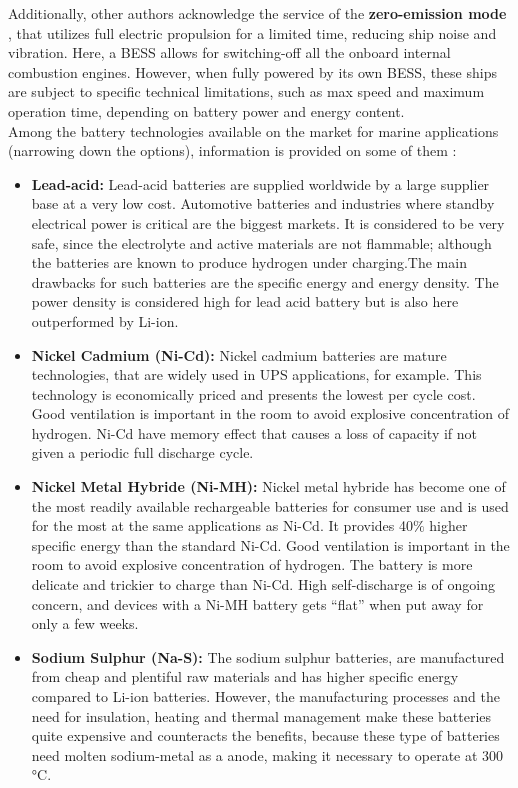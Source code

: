 Additionally, other authors acknowledge the service of the \textbf{zero-emission mode} \cite{Luca}, that utilizes full electric propulsion for a limited time, reducing ship noise and vibration. Here, a BESS allows for switching-off all the onboard internal combustion engines. However, when fully powered by its own BESS, these ships are subject to specific technical limitations, such as max speed and maximum operation time, depending on battery power and energy content.\\

Among the battery technologies available on the market for marine applications (narrowing down the options), information is provided on some of them \cite{EMSA}:

\begin{itemize}
	\item \textbf{Lead-acid:} Lead-acid batteries are supplied worldwide by a large supplier base at a very low cost. Automotive batteries and industries where standby electrical power is critical are the biggest markets. It is considered to be very safe, since the electrolyte and active materials are not flammable; although the batteries are known to produce hydrogen under charging.The main drawbacks for such batteries are the specific energy and energy density. The power density is considered high for lead acid battery but is also here outperformed by Li-ion.
	\item \textbf{Nickel Cadmium (Ni-Cd):} Nickel cadmium batteries are mature technologies, that are widely used in UPS applications, for example. This technology is economically priced and presents the lowest per cycle cost. Good ventilation is important in the room to avoid explosive concentration of hydrogen. Ni-Cd have memory effect that causes a loss of capacity if not given a periodic full discharge cycle.
	\item \textbf{Nickel Metal Hybride (Ni-MH):} Nickel metal hybride has become one of the most readily available rechargeable batteries for consumer use and is used for the most at the same applications as Ni-Cd. It provides 40$\%$ higher specific energy than the standard Ni-Cd. Good ventilation is important in the room to avoid explosive concentration of hydrogen. The battery is more delicate and trickier to charge than Ni-Cd. High self-discharge is of ongoing concern, and devices with a Ni-MH battery gets “flat” when put away for only a few weeks.
	\item \textbf{Sodium Sulphur (Na-S):} The sodium sulphur batteries, are manufactured from cheap and plentiful raw materials and has higher specific energy compared to Li-ion batteries. However, the manufacturing processes and the need for insulation, heating and thermal management make these batteries quite expensive and counteracts the benefits, because these type of batteries need molten sodium-metal as a anode, making it necessary to operate at $300$°C.

\end{itemize}
